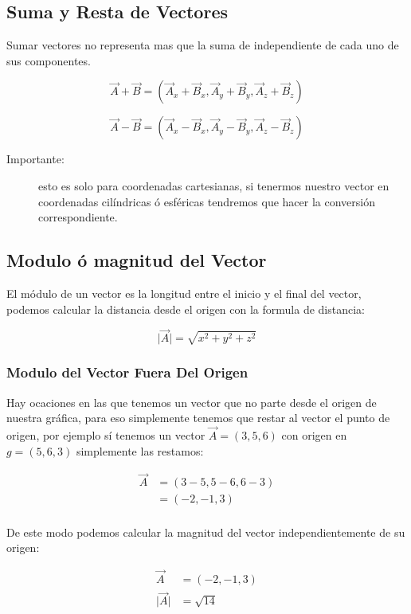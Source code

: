 \documentclass{article}
\begin{document}
\subsection{Suma y Resta de Vectores}
\label{sec:orgef26998}
Sumar vectores no representa mas que la suma de independiente de cada uno de sus componentes.

\[
\vec{A} + \vec{B} = (\vec{A}_x + \vec{B}_x,\vec{A}_y + \vec{B}_y,\vec{A}_z + \vec{B}_z)
\]

\[
\vec{A} - \vec{B} = (\vec{A}_x - \vec{B}_x,\vec{A}_y - \vec{B}_y,\vec{A}_z - \vec{B}_z)
\]

\begin{description}
\item[{Importante:}] esto es solo para coordenadas cartesianas, si tenermos nuestro vector en coordenadas cilíndricas ó esféricas tendremos que hacer la conversión correspondiente.
\end{description}

\subsection{Modulo ó magnitud del Vector}
\label{sec:org2a1eb83}
El módulo de un vector es la longitud entre el inicio y el final del vector, podemos calcular la distancia desde el origen con la formula de distancia:

\[
\vert\vec{A}\vert = \sqrt{ x^2 + y^2 + z^2 }
\]

\subsubsection*{Modulo del Vector Fuera Del Origen}
\label{sec:org2a3e7df}
Hay ocaciones en las que tenemos un vector que no parte desde el origen de nuestra gráfica, para eso simplemente tenemos que restar al vector el punto de origen, por ejemplo sí tenemos un vector \(\vec{A} = (3,5,6)\) con origen en \(g = (5,6,3)\) simplemente las restamos:

\[ \begin{aligned}
\vec{A} &= (3-5,5-6,6-3) \\
~ &= (-2,-1,3) \\
\end{aligned} \]

De este modo podemos calcular la magnitud del vector independientemente de su origen:

\[ \begin{aligned}
\vec{A} &= (-2,-1,3) \\
\vert\vec{A}\vert &= \sqrt{14} \\
\end{aligned} \]
\end{document}
